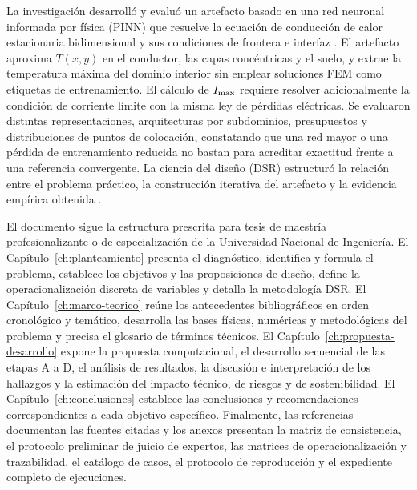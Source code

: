 La investigación desarrolló y evaluó un artefacto basado en una red neuronal informada por física (PINN) que resuelve la ecuación de conducción de calor estacionaria bidimensional y sus condiciones de frontera e interfaz \parencite{raissi2019}. El artefacto aproxima $T(x,y)$ en el conductor, las capas concéntricas y el suelo, y extrae la temperatura máxima del dominio interior sin emplear soluciones FEM como etiquetas de entrenamiento. El cálculo de $I_{\max}$ requiere resolver adicionalmente la condición de corriente límite con la misma ley de pérdidas eléctricas. Se evaluaron distintas representaciones, arquitecturas por subdominios, presupuestos y distribuciones de puntos de colocación, constatando que una red mayor o una pérdida de entrenamiento reducida no bastan para acreditar exactitud frente a una referencia convergente. La ciencia del diseño (DSR) estructuró la relación entre el problema práctico, la construcción iterativa del artefacto y la evidencia empírica obtenida \parencites[54--56]{peffers2007}[342--350]{gregor2013}.

El documento sigue la estructura prescrita para tesis de maestría profesionalizante o de especialización de la Universidad Nacional de Ingeniería. El Capítulo~\ref{ch:planteamiento} presenta el diagnóstico, identifica y formula el problema, establece los objetivos y las proposiciones de diseño, define la operacionalización discreta de variables y detalla la metodología DSR. El Capítulo~\ref{ch:marco-teorico} reúne los antecedentes bibliográficos en orden cronológico y temático, desarrolla las bases físicas, numéricas y metodológicas del problema y precisa el glosario de términos técnicos. El Capítulo~\ref{ch:propuesta-desarrollo} expone la propuesta computacional, el desarrollo secuencial de las etapas A a D, el análisis de resultados, la discusión e interpretación de los hallazgos y la estimación del impacto técnico, de riesgos y de sostenibilidad. El Capítulo~\ref{ch:conclusiones} establece las conclusiones y recomendaciones correspondientes a cada objetivo específico. Finalmente, las referencias documentan las fuentes citadas y los anexos presentan la matriz de consistencia, el protocolo preliminar de juicio de expertos, las matrices de operacionalización y trazabilidad, el catálogo de casos, el protocolo de reproducción y el expediente completo de ejecuciones.
